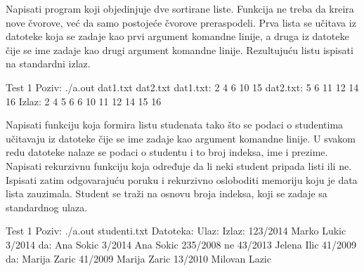 \begin{Exercise}[label=607]

Napisati program koji objedinjuje dve sortirane liste. Funkcija ne treba da 
kreira nove čvorove, već da samo
postojeće čvorove preraspodeli. Prva lista se učitava iz datoteke koja se 
zadaje kao prvi argument komandne
linije, a druga iz datoteke čije se ime zadaje kao drugi argument komandne linije. Rezultujuću listu ispisati na standardni izlaz.

\begin{miditest}
  \begin{test}{Test 1}
Poziv: ./a.out dat1.txt dat2.txt
dat1.txt: 2 4 6 10 15
dat2.txt: 5 6 11 12 14 16
Izlaz: 2 4 5 6 6 10 11 12 14 15 16
  \end{test}
\end{miditest}
  
\end{Exercise}
\begin{Answer}[ref=607]
\end{Answer}



\begin{Exercise}[label=608]
Napisati funkciju koja formira listu studenata tako što se podaci o studentima 
učitavaju iz datoteke čije se ime zadaje kao argument komandne linije. 
U svakom redu datoteke nalaze se podaci o studentu i to broj indeksa, ime
i prezime. Napisati rekurzivnu funkciju koja određuje da li neki student pripada listi ili ne.
Ispisati zatim odgovarajuću poruku i rekurzivno osloboditi memoriju koju je data lista zauzimala.
Student se traži na osnovu broja indeksa, koji se zadaje sa standardnog ulaza.
\begin{maxitest}
    \begin{test}{Test 1}
Poziv: ./a.out studenti.txt
Datoteka:                 Ulaz:       Izlaz:
123/2014 Marko Lukic      3/2014      da: Ana Sokic
3/2014 Ana Sokic          235/2008    ne
43/2013 Jelena Ilic       41/2009     da: Marija Zaric
41/2009 Marija Zaric
13/2010 Milovan Lazic
  \end{test}
\end{maxitest}

\end{Exercise}
\begin{Answer}[ref=608]
\end{Answer}


